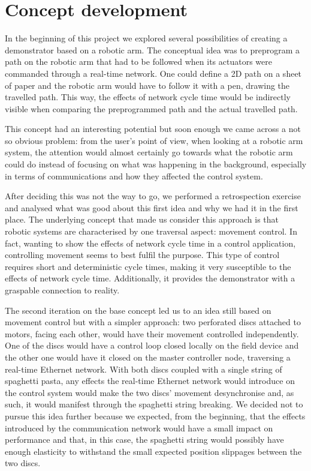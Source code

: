 \section{Concept development}

In the beginning of this project we explored several possibilities of creating a demonstrator based on a robotic arm.
The conceptual idea was to preprogram a path on the robotic arm that had to be followed when its actuators were commanded through a real-time network.
One could define a 2D path on a sheet of paper and the robotic arm would have to follow it with a pen, drawing the travelled path.
This way, the effects of network cycle time would be indirectly visible when comparing the preprogrammed path and the actual travelled path.

This concept had an interesting potential but soon enough we came across a not so obvious problem: from the user's point of view, when looking at a robotic arm system, the attention would almost certainly go towards what the robotic arm could do instead of focusing on what was happening in the background, especially in terms of communications and how they affected the control system.

After deciding this was not the way to go, we performed a retrospection exercise and analysed what was good about this first idea and why we had it in the first place.
The underlying concept that made us consider this approach is that robotic systems are characterised by one traversal aspect: movement control.
In fact, wanting to show the effects of network cycle time in a control application, controlling movement seems to best fulfil the purpose.
This type of control requires short and deterministic cycle times, making it very susceptible to the effects of network cycle time.
Additionally, it provides the demonstrator with a graspable connection to reality.

The second iteration on the base concept led us to an idea still based on movement control but with a simpler approach: two perforated discs attached to motors, facing each other, would have their movement controlled independently.
One of the discs would have a control loop closed locally on the field device and the other one would have it closed on the master controller node, traversing a real-time Ethernet network.
With both discs coupled with a single string of spaghetti pasta, any effects the real-time Ethernet network would introduce on the control system would make the two discs' movement desynchronise and, as such, it would manifest through the spaghetti string breaking.
We decided not to pursue this idea further because we expected, from the beginning, that the effects introduced by the communication network would have a small impact on performance and that, in this case, the spaghetti string would possibly have enough elasticity to withstand the small expected position slippages between the two discs.

